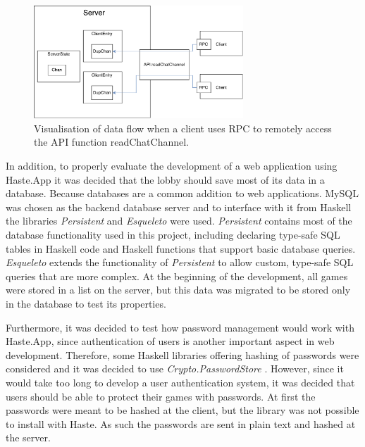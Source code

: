 \documentclass[a4paper]{article}
\begin{document}
\begin{figure}[h!]
    \centering
    \includegraphics[scale=0.5,width=0.7\textwidth]{figure/readChatFromServer}
    \caption{Visualisation of data flow when a client uses RPC to remotely access the API function readChatChannel.}
    \label{fig:read-chat-from-server}
\end{figure}

In addition, to properly evaluate the development of a web application using Haste.App it was decided that the lobby should save most of its data in a database. Because databases are a common addition to web applications. MySQL was chosen as the backend database server and to interface with it from Haskell the libraries \textit{Persistent} \cite{persistent-yesod} and \textit{Esqueleto} \cite{esqueleto-hackage} were used. \textit{Persistent} contains most of the database functionality used in this project, including declaring type-safe SQL tables in Haskell code and Haskell functions that support basic database queries. \textit{Esqueleto} extends the functionality of \textit{Persistent} to allow  custom, type-safe SQL queries that are more complex. At the beginning of the development, all games were stored in a list on the server, but this data was migrated to be stored only in the database to test its properties.

Furthermore, it was decided to test how password management would work with Haste.App, since authentication of users is another important aspect in web development. Therefore, some Haskell libraries offering hashing of passwords were considered and it was decided to use \textit{Crypto.PasswordStore} \cite{pwstore-package}. However, since it would take too long to develop a user authentication system, it was decided that users should be able to protect their games with passwords. At first the passwords were meant to be hashed at the client, but the library was not possible to install with Haste. As such the passwords are sent in plain text and hashed at the server.
\end{document}
